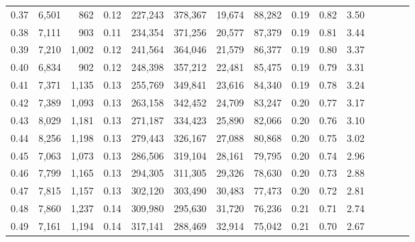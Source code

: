 \begin{tabular}{rrrcrrrrrrrrrrr}
0.37 &   6,501 &     862 &                                       0.12 &  227,243 &  378,367 &   19,674 &   88,282 &  0.19 &  0.82 &                         3.50 \\
0.38 &   7,111 &     903 &                                       0.11 &  234,354 &  371,256 &   20,577 &   87,379 &  0.19 &  0.81 &                         3.44 \\
0.39 &   7,210 &   1,002 &                                       0.12 &  241,564 &  364,046 &   21,579 &   86,377 &  0.19 &  0.80 &                         3.37 \\
0.40 &   6,834 &     902 &                                       0.12 &  248,398 &  357,212 &   22,481 &   85,475 &  0.19 &  0.79 &                         3.31 \\
0.41 &   7,371 &   1,135 &                                       0.13 &  255,769 &  349,841 &   23,616 &   84,340 &  0.19 &  0.78 &                         3.24 \\
0.42 &   7,389 &   1,093 &                                       0.13 &  263,158 &  342,452 &   24,709 &   83,247 &  0.20 &  0.77 &                         3.17 \\
0.43 &   8,029 &   1,181 &                                       0.13 &  271,187 &  334,423 &   25,890 &   82,066 &  0.20 &  0.76 &                         3.10 \\
0.44 &   8,256 &   1,198 &                                       0.13 &  279,443 &  326,167 &   27,088 &   80,868 &  0.20 &  0.75 &                         3.02 \\
0.45 &   7,063 &   1,073 &                                       0.13 &  286,506 &  319,104 &   28,161 &   79,795 &  0.20 &  0.74 &                         2.96 \\
0.46 &   7,799 &   1,165 &                                       0.13 &  294,305 &  311,305 &   29,326 &   78,630 &  0.20 &  0.73 &                         2.88 \\
0.47 &   7,815 &   1,157 &                                       0.13 &  302,120 &  303,490 &   30,483 &   77,473 &  0.20 &  0.72 &                         2.81 \\
0.48 &   7,860 &   1,237 &                                       0.14 &  309,980 &  295,630 &   31,720 &   76,236 &  0.21 &  0.71 &                         2.74 \\
0.49 &   7,161 &   1,194 &                                       0.14 &  317,141 &  288,469 &   32,914 &   75,042 &  0.21 &  0.70 &                         2.67 \\

\end{tabular}
